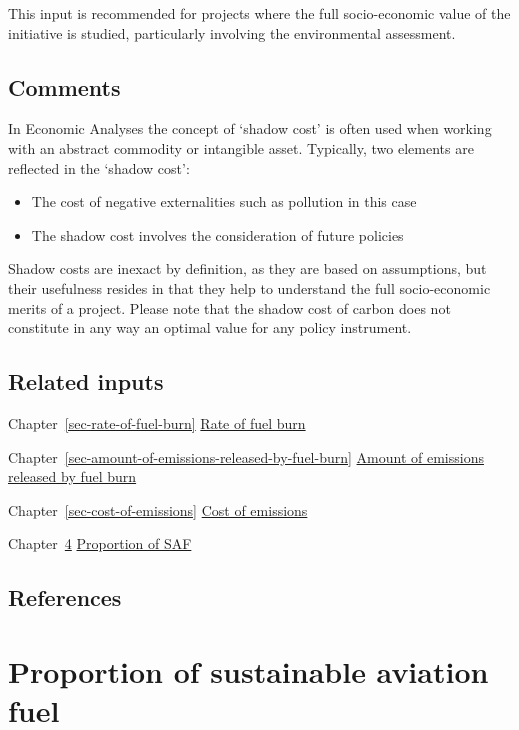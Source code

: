 \documentclass[
  11pt,
  a4paper,
]{book}
\providecommand{\tightlist}{%
  \setlength{\itemsep}{0pt}\setlength{\parskip}{0pt}}\usepackage{longtable,booktabs,array}
\begin{document}
This input is recommended for projects where the full socio-economic
value of the initiative is studied, particularly involving the
environmental assessment.

\hypertarget{comments-3}{%
\section{Comments}\label{comments-3}}

In Economic Analyses the concept of `shadow cost' is often used when
working with an abstract commodity or intangible asset. Typically, two
elements are reflected in the `shadow cost':

\begin{itemize}
\tightlist
\item
  The cost of negative externalities such as pollution in this case
\item
  The shadow cost involves the consideration of future policies
\end{itemize}

Shadow costs are inexact by definition, as they are based on
assumptions, but their usefulness resides in that they help to
understand the full socio-economic merits of a project. Please note that
the shadow cost of carbon does not constitute in any way an optimal
value for any policy instrument.

\hypertarget{related-inputs-8}{%
\section{Related inputs}\label{related-inputs-8}}

Chapter~\ref{sec-rate-of-fuel-burn}
\protect\hyperlink{sec-rate-of-fuel-burn}{Rate of fuel burn}

Chapter~\ref{sec-amount-of-emissions-released-by-fuel-burn}
\protect\hyperlink{sec-amount-of-emissions-released-by-fuel-burn}{Amount
of emissions released by fuel burn}

Chapter~\ref{sec-cost-of-emissions}
\protect\hyperlink{sec-cost-of-emissions}{Cost of emissions}

Chapter~\ref{sec-proportion-of-saf}
\protect\hyperlink{sec-proportion-of-saf}{Proportion of SAF}

\hypertarget{references-10}{%
\section{References}\label{references-10}}

\hypertarget{sec-proportion-of-saf}{%
\chapter{Proportion of sustainable aviation
fuel}\label{sec-proportion-of-saf}}
\end{document}
